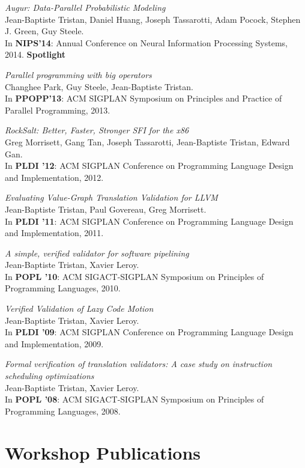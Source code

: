 \documentclass[margin,line]{res}
\begin{document}
\begin{resume}
\emph{Augur: Data-Parallel Probabilistic Modeling}\\
Jean-Baptiste Tristan, Daniel Huang, Joseph Tassarotti, Adam Pocock, Stephen J. Green, Guy Steele.\\
In {\bf NIPS'14}: Annual Conference on Neural Information Processing Systems, 2014. {\bf Spotlight}

\emph{Parallel programming with big operators}\\
Changhee Park, Guy Steele, Jean-Baptiste Tristan.\\
In {\bf PPOPP'13}: ACM SIGPLAN Symposium on
Principles and Practice of Parallel Programming, 2013. 

\emph{RockSalt: Better, Faster, Stronger SFI for the x86}\\
Greg Morrisett, Gang Tan, Joseph Tassarotti, Jean-Baptiste Tristan, Edward Gan.\\
In {\bf PLDI '12}: ACM SIGPLAN Conference on Programming
Language Design and Implementation, 2012. 

\emph{Evaluating Value-Graph Translation Validation for LLVM}\\
Jean-Baptiste Tristan, Paul Govereau, Greg Morrisett.\\
In {\bf PLDI '11}: ACM SIGPLAN Conference on Programming
Language Design and Implementation, 2011. 

\emph{A simple, verified validator for software pipelining}\\
Jean-Baptiste Tristan, Xavier Leroy.\\
In {\bf POPL '10}: ACM SIGACT-SIGPLAN Symposium on
Principles of Programming Languages, 2010.

\emph{Verified Validation of Lazy Code Motion}\\
Jean-Baptiste Tristan, Xavier Leroy.\\
In {\bf PLDI '09}: ACM SIGPLAN Conference on Programming
Language Design and Implementation, 2009. 

\emph{Formal verification of translation validators: A case study on instruction scheduling optimizations}\\
Jean-Baptiste Tristan, Xavier Leroy.\\
In {\bf POPL '08}: ACM SIGACT-SIGPLAN Symposium on
Principles of Programming Languages, 2008.

\section{\sc Workshop Publications}


\end{resume}
\end{document}
